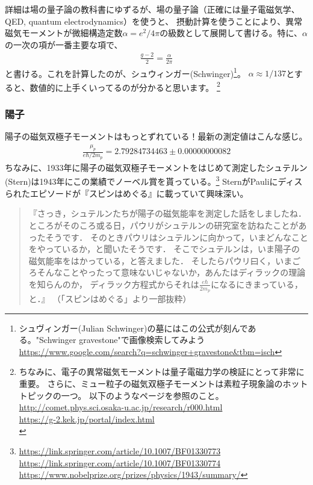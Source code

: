 \documentclass[10pt,a4paper]{jarticle}
\begin{document}
詳細は場の量子論の教科書にゆずるが、場の量子論（正確には量子電磁気学、QED, quantum electrodynamics）を使うと、
摂動計算を使うことにより、異常磁気モーメントが微細構造定数$\alpha = e^2/4\pi$の級数として展開して書ける。特に、$\alpha$の一次の項が一番主要な項で、
\begin{align}
\frac{g-2}{2} = \frac{\alpha}{2\pi}
\end{align}
と書ける。これを計算したのが、シュウィンガー(Schwinger)\cite{Schwinger:1948iu}\footnote{
シュヴィンガー(Julian Schwinger)の墓にはこの公式が刻んである。"Schwinger gravestone"で画像検索してみよう
\url{https://www.google.com/search?q=schwinger+gravestone&tbm=isch}}。
$\alpha \approx 1/137$とすると、数値的に上手くいってるのが分かると思います。
\footnote{
ちなみに、電子の異常磁気モーメントは量子電磁力学の検証にとって非常に重要。
さらに、ミュー粒子の磁気双極子モーメントは素粒子現象論のホットトピックの一つ\cite{muong-2}。
以下のようなページを参照のこと。\\
\url{http://comet.phys.sci.osaka-u.ac.jp/research/r000.html}\\
\url{https://g-2.kek.jp/portal/index.html}\\}

\subsubsection{陽子}
陽子の磁気双極子モーメントはもっとずれている！最新の測定値はこんな感じ。
\begin{align}
\frac{\mu_p}{e\hbar/2m_p} = 2.79284734463 \pm 0.00000000082
\end{align}
ちなみに、1933年に陽子の磁気双極子モーメントをはじめて測定したシュテルン(Stern)は1943年にこの業績でノーベル賞を貰っている。\footnote{
\url{https://link.springer.com/article/10.1007/BF01330773}\\
\url{https://link.springer.com/article/10.1007/BF01330774}\\
\url{https://www.nobelprize.org/prizes/physics/1943/summary/}
}
SternがPauliにディスられたエピソードが『スピンはめぐる』に載っていて興味深い。
\begin{quote}
『さっき，シュテルンたちが陽子の磁気能率を測定した話をしましたね．
ところがそのころ或る日，パウリがシュテルンの研究室を訪ねたことがあったそうです．
そのときパウリはシュテルンに向かって，いまどんなことをやっているか，と聞いたそうです．
そこでシュテルンは，いま陽子の磁気能率をはかっている，と答えました．
そしたらパウリ曰く，いまごろそんなことやったって意味ないじゃないか，あんたはディラックの理論を知らんのか，
ディラック方程式からそれは$\displaystyle\frac{e\hbar}{2m_p}$になるにきまっている，と．』
（「スピンはめぐる」より一部抜粋）
\end{quote}
\end{document}
